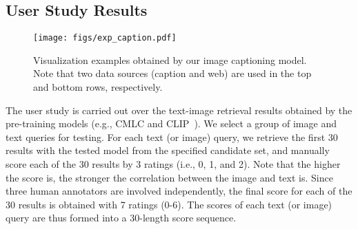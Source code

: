 \documentclass[10pt,twocolumn,letterpaper]{article}
\begin{document}
\subsection{User Study Results}

\begin{table}[t]
    \centering
    \caption{User study results for the text-image retrieval downstream task. Three human annotators are involved in such user study. }
    \vspace{0.03in}
    \label{tab:user_study}
    \footnotesize
\end{table}

\begin{figure}[t]
    \centering
    \texttt{[image: figs/exp\_caption.pdf]}
\caption{
    Visualization examples obtained by our image captioning model. Note that two data sources (caption and web) are used in the top and bottom rows, respectively. }
    \label{fig:exp_caption}
\end{figure}

The user study is carried out over the text-image retrieval results obtained by the pre-training models (e.g., CMLC and CLIP~\cite{radford2021learning}). We select a group of image and text queries for testing. For each text (or image) query, we retrieve the first 30 results with the tested model from the specified candidate set, and manually score each of the 30 results by 3 ratings (i.e., 0, 1, and 2). Note that the higher the score is, the stronger the correlation between the image and text is. Since three human annotators are involved independently, the final score for each of the 30 results is obtained with 7 ratings (0-6). The scores of each text (or image) query are thus formed into a 30-length score sequence.
\end{document}

